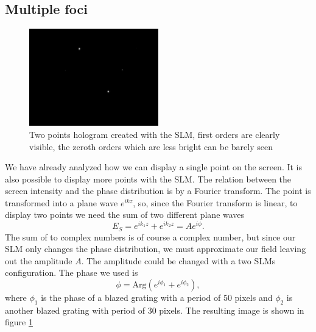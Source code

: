 \documentclass[a4paper,10pt]{article}
\begin{document}
\subsection{Multiple foci}
\begin{figure}[H]
\centering
\includegraphics[width=0.5\textwidth]{combined}
\caption{Two points hologram created with the SLM, first orders are clearly visible, the zeroth orders which are less bright can be barely seen}\label{combined}
\end{figure}
We have already analyzed how we can display a single point on the screen. It is also possible to display more points with the SLM. The relation between the screen intensity and the phase distribution is by a Fourier transform. The point is transformed into a plane wave $e^{ikz}$, so, since the Fourier transform is linear, to display two points we need the sum of two different plane waves
\begin{equation}E_S = e^{ik_1 z} + e^{ik_2 z} = Ae^{i\phi}.\end{equation}
The sum of to complex numbers is of course a complex number, but since our SLM only changes the phase distribution, we must approximate our field leaving out the amplitude $A$. The amplitude could be changed with a two SLMs configuration. The phase we used is
\begin{equation}\phi = \text{Arg}(e^{i\phi_1} + e^{i \phi_2}),\end{equation}
where $\phi_1$ is the phase of a blazed grating with a period  of 50 pixels and $\phi_2$ is another blazed grating with period of 30 pixels. The resulting image is shown in figure \ref{combined}
\end{document}
